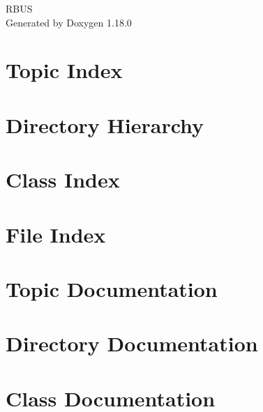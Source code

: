 \documentclass[twoside]{book}
\newcommand{\+}{\discretionary{\mbox{\scriptsize$\hookleftarrow$}}{}{}}
\newcommand{\clearemptydoublepage}{%
    \newpage{\pagestyle{empty}\cleardoublepage}%
  }
\begin{document}
  \raggedbottom
    \hypersetup{pageanchor=false,
                bookmarksnumbered=true,
                pdfencoding=unicode
               }
  \begin{titlepage}
  \vspace*{7cm}
  \begin{center}%
  {\Large RBUS}\\
  \vspace*{1cm}
  {\large Generated by Doxygen 1.18.0}\\
  \end{center}
  \end{titlepage}
  \clearemptydoublepage
  \tableofcontents
  \clearemptydoublepage
  \hypersetup{pageanchor=true}

\chapter{Topic Index}

\chapter{Directory Hierarchy}

\chapter{Class Index}

\chapter{File Index}

\chapter{Topic Documentation}










\chapter{Directory Documentation}

\chapter{Class Documentation}



















\end{document}

